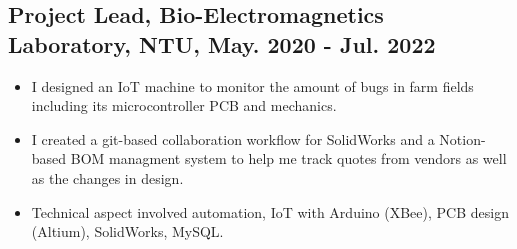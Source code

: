 \documentclass[12pt]{article}
\begin{document}
        \subsection*{Project Lead, Bio-Electromagnetics Laboratory, NTU, May. 2020 - Jul. 2022}
        {\sffamily
        \begin{itemize}
            \item I designed an IoT machine to monitor the amount of bugs in farm fields including its microcontroller PCB and mechanics.
            \item I created a git-based collaboration workflow for SolidWorks and a Notion-based BOM managment system to help me track quotes from vendors as well as the changes in design.
            \item Technical aspect involved automation, IoT with Arduino (XBee), PCB design (Altium), SolidWorks, MySQL.
        \end{itemize}
        }
        
        
\end{document}
